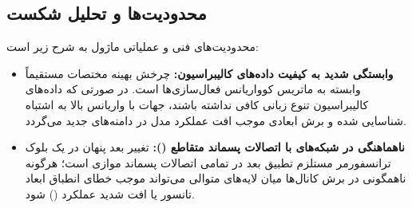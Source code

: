 \subsection{محدودیت‌ها و تحلیل شکست}
محدودیت‌های فنی و عملیاتی ماژول  به شرح زیر است:
\begin{itemize}
    \item \textbf{وابستگی شدید به کیفیت داده‌های کالیبراسیون:} چرخش بهینه مختصات مستقیماً وابسته به ماتریس کوواریانس فعال‌سازی‌ها است. در صورتی که داده‌های کالیبراسیون تنوع زبانی کافی نداشته باشند، جهات با واریانس بالا به اشتباه شناسایی شده و برش ابعادی موجب افت عملکرد مدل در دامنه‌های جدید می‌گردد.
    \item \textbf{ناهماهنگی در شبکه‌های با اتصالات پسماند متقاطع ():} تغییر بعد پنهان در یک بلوک ترانسفورمر مستلزم تطبیق بعد در تمامی اتصالات پسماند موازی است؛ هرگونه ناهمگونی در برش کانال‌ها میان لایه‌های متوالی می‌تواند موجب خطای انطباق ابعاد تانسور یا افت شدید عملکرد () شود.
\end{itemize}
